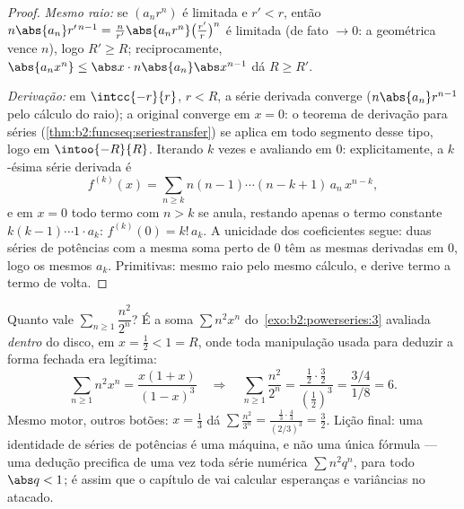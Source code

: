 \begin{proof}
\emph{Mesmo raio:} se $(a_nr^n)$ é limitada e $r' < r$, então
$n\abs{a_n} r'^{\,n-1} = \frac{n}{r'}\abs{a_nr^n}
\bigl(\frac{r'}{r}\bigr)^n$ é limitada (de fato $\to 0$: a geométrica
vence $n$), logo $R' \geq R$; reciprocamente, $\abs{a_n x^n} \leq \abs x
\cdot n\abs{a_n}\abs x^{n-1}$ dá $R \geq R'$.

\emph{Derivação:} em $\intcc{-r}{r}$, $r < R$, a série
derivada converge  ($n\abs{a_n}r^{n-1}$  pelo
cálculo do raio); a original converge em $x = 0$: o
teorema de derivação para séries
(\cref{thm:b2:funcseq:seriestransfer}) se aplica em todo segmento
desse tipo, logo em $\intoo{-R}{R}$. Iterando $k$ vezes e
avaliando em $0$: explicitamente, a $k$-ésima série derivada é
\[
f^{(k)}(x) = \sum_{n\geq k} n(n-1)\cdots(n-k+1)\,a_n\,x^{n-k},
\]
e em $x = 0$ todo termo com $n > k$ se anula, restando apenas
o termo constante $k(k-1)\cdots1\cdot a_k$: $f^{(k)}(0) =
k!\,a_k$. A unicidade dos coeficientes segue: duas séries de potências
com a mesma soma perto de $0$ têm as mesmas derivadas em $0$,
logo os mesmos $a_k$. Primitivas: mesmo raio pelo mesmo
cálculo, e derive termo a termo de volta.
\end{proof}

\begin{example}\label{ex:b2:powerseries:evaluate}
Quanto vale $\sum_{n\geq1}\dfrac{n^2}{2^n}$? É a soma
$\sum n^2x^n$ do~\cref{exo:b2:powerseries:3} avaliada
\emph{dentro} do disco, em $x = \frac12 < 1 = R$, onde toda
manipulação usada para deduzir a forma fechada era legítima:
\[
\sum_{n\geq1} n^2x^n = \frac{x(1+x)}{(1-x)^3}
\quad\Longrightarrow\quad
\sum_{n\geq1}\frac{n^2}{2^n}
= \frac{\frac12\cdot\frac32}{(\frac12)^3}
= \frac{3/4}{1/8} = 6 .
\]
Mesmo motor, outros botões: $x = \frac13$ dá
$\sum\frac{n^2}{3^n} = \frac{\frac13\cdot\frac43}{(2/3)^3} =
\frac32$. Lição final: uma identidade de séries de potências é uma
máquina, e não uma única fórmula --- uma dedução precifica de uma vez
toda série numérica $\sum n^2q^n$, para todo $\abs q < 1$;
é assim que o capítulo de  vai calcular
esperanças e variâncias no atacado.
\end{example}

